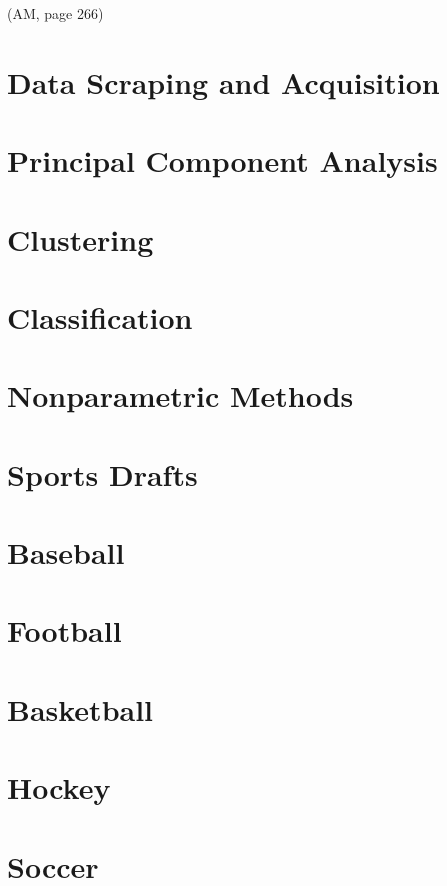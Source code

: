 \documentclass[
  11pt,
]{book}
\theoremstyle{definition}
\theoremstyle{definition}
\theoremstyle{definition}
\theoremstyle{definition}
\theoremstyle{remark}
\begin{document}
(AM, page 266)

\newpage

\hypertarget{data-scraping-and-acquisition}{%
\chapter{Data Scraping and Acquisition}\label{data-scraping-and-acquisition}}

\hypertarget{principal-component-analysis}{%
\chapter{Principal Component Analysis}\label{principal-component-analysis}}

\hypertarget{clustering}{%
\chapter{Clustering}\label{clustering}}

\hypertarget{classification}{%
\chapter{Classification}\label{classification}}

\hypertarget{nonparametric-methods}{%
\chapter{Nonparametric Methods}\label{nonparametric-methods}}

\hypertarget{sports-drafts}{%
\chapter{Sports Drafts}\label{sports-drafts}}

\hypertarget{baseball-1}{%
\chapter{Baseball}\label{baseball-1}}

\hypertarget{football-1}{%
\chapter{Football}\label{football-1}}

\hypertarget{basketball-1}{%
\chapter{Basketball}\label{basketball-1}}

\hypertarget{hockey-1}{%
\chapter{Hockey}\label{hockey-1}}

\hypertarget{soccer-1}{%
\chapter{Soccer}\label{soccer-1}}

  
\end{document}
